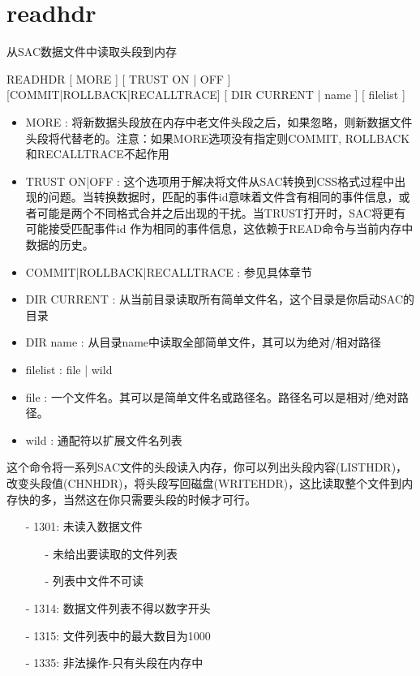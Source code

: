 \section{readhdr}
\label{cmd:readhdr}

从SAC数据文件中读取头段到内存

READHDR [ MORE ] [ TRUST ON | OFF ] [COMMIT|ROLLBACK|RECALLTRACE] [ DIR CURRENT | name ] [ filelist ]

\begin{itemize}
\item MORE : 将新数据头段放在内存中老文件头段之后，如果忽略，则新数据文件头段将代替老的。注意：如果MORE选项没有指定则COMMIT, ROLLBACK和RECALLTRACE不起作用\\
\item TRUST ON|OFF : 这个选项用于解决将文件从SAC转换到CSS格式过程中出现的问题。当转换数据时，匹配的事件id意味着文件含有相同的事件信息，或者可能是两个不同格式合并之后出现的干扰。当TRUST打开时，SAC将更有可能接受匹配事件id 作为相同的事件信息，这依赖于READ命令与当前内存中数据的历史。
\item COMMIT|ROLLBACK|RECALLTRACE  : 参见具体章节 
\item DIR CURRENT : 从当前目录读取所有简单文件名，这个目录是你启动SAC的目录 
\item DIR name : 从目录name中读取全部简单文件，其可以为绝对/相对路径 
\item filelist :  file | wild 
\item file : 一个文件名。其可以是简单文件名或路径名。路径名可以是相对/绝对路径。 
\item wild : 通配符以扩展文件名列表 
\end{itemize}

这个命令将一系列SAC文件的头段读入内存，你可以列出头段内容(LISTHDR)，改变头段值(CHNHDR)，将头段写回磁盘(WRITEHDR)，这比读取整个文件到内存快的多，当然这在你只需要头段的时候才可行。

\begin{itemize}
\item[-]1301: 未读入数据文件
	\begin{itemize}
	\item[-]未给出要读取的文件列表
	\item[-]列表中文件不可读
	\end{itemize}
	\item[-]1314: 数据文件列表不得以数字开头
	\item[-]1315: 文件列表中的最大数目为1000
	\item[-]1335: 非法操作-只有头段在内存中
\end{itemize}

